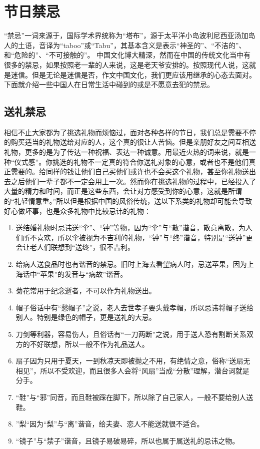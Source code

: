 \section{节日禁忌} 

    “禁忌”一词来源于，国际学术界统称为“塔布”，源于太平洋小岛波利尼西亚汤加岛人的土语，音译为“taboo”或“Tabu”，其基本含义是表示“神圣的”、“不洁的”、和“危险的”、“不可接触的”。
    中国文化博大精深，然而在中国的传统文化当中有很多的禁忌，如果按照老一辈的人来说，这是老天爷安排的。按照现代人说，这就是迷信。但是无论是迷信是否，作文中国文化，我们更应该用继承的心态去面对。下面就介绍一些中国人在日常生活中碰到的或是不愿意去犯的禁忌。



\subsection{送礼禁忌}

    相信不止大家都为了挑选礼物而烦恼过，面对各种各样的节日，我们总是需要不停的购买适当的礼物送给对应的人，这个真的很让人苦恼。但是亲朋好友之间互相送礼物，更多的是为了传达一种祝福、表达一种诚意。用最近火热的词来说，就是一种“仪式感”。你挑选的礼物不一定真的符合你送礼对象的心意，或者也不是他们真正需要的。给同样的钱让他们自己买他们或许也不会买这个礼物，甚至你礼物送出去之后他们一辈子都不一定会用上一次。然而你在挑选礼物的过程中，已经投入了大量的精力和时间，而正是这些东西，会让对方感受到你的心意，这就是所谓的“礼轻情意重。”所以但是根据中国的风俗传统，送以下系类的礼物却可能会导致好心做坏事，也是众多礼物中比较忌讳的礼物：

    \begin{enumerate}
   \item 
   送结婚礼物时忌讳送“伞”、“钟”等物，因为“伞”与“散”谐音，散意离散，为人们所不喜欢，所以伞被视为不吉利的礼物，“钟”与“终”谐音，特别是“送钟”更会让老人们联想到“送终”，很不吉利。
   \item
   给病人送食品时也有谐音的禁忌。旧时上海去看望病人时，忌送苹果，因为上海话中“苹果”的发音与“病故”谐音。
   \item
   菊花常用于纪念逝者，不可以作为礼物送出。
   \item
   帽子俗话中有“愁帽子”之说，老人去世孝子要头戴孝帽，所以忌讳将帽子送给别人。特别是绿色的帽子，更是送礼的大忌。
   \item
   刀剑等利器，容易伤人，且俗话有“一刀两断”之说，用于送人恐有割断关系双方的不好联想，所以一般不作为礼品送人。
   \item
   扇子因为只用于夏天，一到秋凉天即被抛之不用，有绝情之意，俗称“送扇无相见”，所以不受欢迎，而且很多人会将“风扇”当成“分散”理解，潜台词就是分手。
   \item
   “鞋”与“邪”同音，而且鞋被踩在脚下，所以除了自己家人，一般不要给别人送鞋。
   \item
   ”梨“因为“梨”与“离”谐音，给夫妻、恋人不能送就很不适合。
   \item
   “镜子”与“禁子”谐音，且镜子易破易碎，所以也属于属送礼的忌讳之物。
        
    \end{enumerate}



